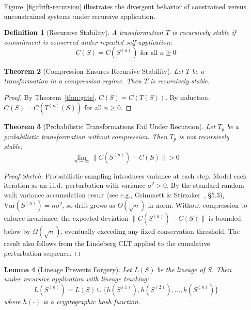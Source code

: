\documentclass[11pt,a4paper]{article}
\newtheorem{theorem}{Theorem}[section]
\newtheorem{lemma}[theorem]{Lemma}
\newtheorem{definition}[theorem]{Definition}
\begin{document}
Figure~\ref{fig:drift-recursion} illustrates the divergent behavior of constrained versus unconstrained systems under recursive application.



\begin{definition}[Recursive Stability]
A transformation $T$ is recursively stable if commitment is conserved under repeated self-application:
\begin{equation}
C(S) = C(S^{(n)}) \text{ for all } n \geq 0
\end{equation}
\end{definition}

\begin{theorem}[Compression Ensures Recursive Stability]
\label{thm:recursive-stability}
Let $T$ be a transformation in a compression regime. Then $T$ is recursively stable.
\end{theorem}

\begin{proof}
By Theorem~\ref{thm:gate}, $C(S) = C(T(S))$. By induction, $C(S) = C(T^{(n)}(S))$ for all $n \geq 0$.
\end{proof}

\begin{theorem}[Probabilistic Transformations Fail Under Recursion]
\label{thm:prob-fail}
Let $T_p$ be a probabilistic transformation without compression. Then $T_p$ is not recursively stable:
\begin{equation}
\lim_{n \to \infty} \|C(S^{(n)}) - C(S)\| > 0
\end{equation}
\end{theorem}

\begin{proof}[Proof Sketch]
Probabilistic sampling introduces variance at each step. Model each iteration as an i.i.d.\ perturbation with variance $\sigma^2 > 0$. By the standard random-walk variance accumulation result (see e.g., Grimmett \& Stirzaker~\cite{grimmett2001}, \S5.3), $\mathrm{Var}(S^{(n)}) = n\sigma^2$, so drift grows as $O(\sqrt{n})$ in norm. Without compression to enforce invariance, the expected deviation $\| C(S^{(n)}) - C(S) \|$ is bounded below by $\Omega(\sqrt{n})$, eventually exceeding any fixed conservation threshold. The result also follows from the Lindeberg CLT applied to the cumulative perturbation sequence.
\end{proof}

\begin{lemma}[Lineage Prevents Forgery]
\label{lem:lineage}
Let $L(S)$ be the lineage of $S$. Then under recursive application with lineage tracking:
\begin{equation}
L(S^{(n)}) = L(S) \cup \{h(S^{(1)}), h(S^{(2)}), \ldots, h(S^{(n)})\}
\end{equation}
where $h(\cdot)$ is a cryptographic hash function.
\end{lemma}
\end{document}
